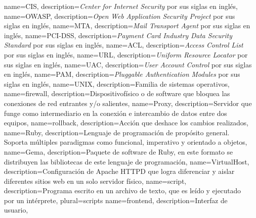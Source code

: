 {
  name={CIS},
  description={\textit{Center for Internet Security} por sus siglas en ingl\'{e}s},
}
{
  name={OWASP},
  description={\textit{Open Web Application Security Project} por sus siglas en ingl\'{e}s},
}
{
  name={MTA},
  description={\textit{Mail Transport Agent} por sus siglas en ingl\'{e}s},
}
{
  name={PCI-DSS},
  description={\textit{Payment Card Industry Data Security Standard} por sus siglas en ingl\'{e}s},
}
{
  name={ACL},
  description={\textit{Access Control List} por sus siglas en ingl\'{e}s},
}
{
  name={URL},
  description={\textit{Uniform Resource Locator} por sus siglas en ingl\'{e}s},
}
{
  name={UAC},
  description={\textit{User Account Control} por sus siglas en ingl\'{e}s},
}
{
  name={PAM},
  description={\textit{Pluggable Authentication Modules} por sus siglas en ingl\'{e}s},
}
%
{
  name={UNIX},
  description={Familia de sistemas operativos},
}
{
  name={firewall},
  description={Dispositivof\'{i}sico o de software que bloquea las conexiones de red entrantes y/o salientes},
}
{
  name={Proxy},
  description={Servidor que funge como intermediario en la conexi\'{o}n e intercambio de datos entre dos equipos},
}
{
  name={rollback},
  description={Acci\'{o}n que deshace los cambios realizados},
}
{
  name={Ruby},
  description={Lenguaje de programaci\'{o}n de prop\'{o}sito general. Soporta m\'{u}ltiples paradigmas como funcional, imperativo y orientado a objetos},
}
{
  name={Gema},
  description={Paquete de software de \Gls{Ruby}, en este formato se distribuyen las bibliotecas de este lenguaje de programaci\'{o}n},
}
{
  name={VirtualHost},
  description={Configuraci\'{o}n de Apache \textsc{HTTPD} que logra diferenciar y aislar diferentes sitios web en un solo servidor f\'{i}sico},
}
{
  name={script},
  description={Programa escrito en un archivo de texto, que es le\'{i}do y ejecutado por un int\'{e}rprete},
  plural={scripts}
}
{
  name={frontend},
  description={Interfaz de usuario},
}
